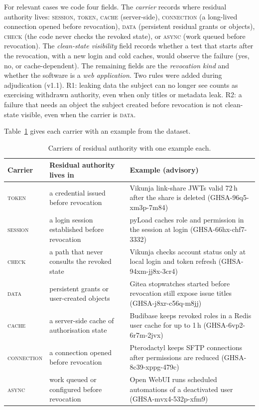 \documentclass[preprint,12pt]{elsarticle}
\begin{document}
For relevant cases we code four fields. The \emph{carrier} records where residual authority lives:
\textsc{session}, \textsc{token}, \textsc{cache} (server-side), \textsc{connection} (a long-lived connection
opened before revocation), \textsc{data} (persistent residual grants or objects), \textsc{check} (the code
never checks the revoked state), or \textsc{async} (work queued before revocation). The \emph{clean-state
visibility} field records whether a test that starts after the revocation, with a new login and cold caches,
would observe the failure (yes, no, or cache-dependent). The remaining fields are the \emph{revocation kind} and
whether the software is a \emph{web application}. Two rules were added during adjudication (v1.1). R1: leaking data
the subject can no longer see counts as exercising withdrawn authority, even when only titles or
metadata leak. R2: a failure that needs an object the subject created before revocation is not clean-state
visible, even when the carrier is \textsc{data}.

Table~\ref{tab:carriers} gives each carrier with an example from the dataset.

\begin{table}[t]
\centering\small
\caption{Carriers of residual authority with one example each.}
\label{tab:carriers}
\footnotesize
\begin{tabularx}{\linewidth}{@{}l>{\raggedright\arraybackslash}p{3.4cm}>{\raggedright\arraybackslash}X@{}}
\toprule
Carrier & Residual authority lives in & Example (advisory) \\
\midrule
\textsc{token} & a credential issued before revocation & Vikunja link-share JWTs valid 72\,h after the share is deleted (GHSA-96q5-xm3p-7m84) \\
\textsc{session} & a login session established before revocation & pyLoad caches role and permission in the session at login (GHSA-66hx-chf7-3332) \\
\textsc{check} & a path that never consults the revoked state & Vikunja checks account status only at local login and token refresh (GHSA-94xm-jj8x-3cr4) \\
\textsc{data} & persistent grants or user-created objects & Gitea stopwatches started before revocation still expose issue titles (GHSA-j8xr-c56q-m8jj) \\
\textsc{cache} & a server-side cache of authorisation state & Budibase keeps revoked roles in a Redis user cache for up to 1\,h (GHSA-6vp2-6r7m-2jvx) \\
\textsc{connection} & a connection opened before revocation & Pterodactyl keeps SFTP connections after permissions are reduced (GHSA-8c39-xppg-479c) \\
\textsc{async} & work queued or configured before revocation & Open WebUI runs scheduled automations of a deactivated user (GHSA-mvx4-532p-xfm9) \\
\bottomrule
\end{tabularx}
\end{table}
\end{document}

